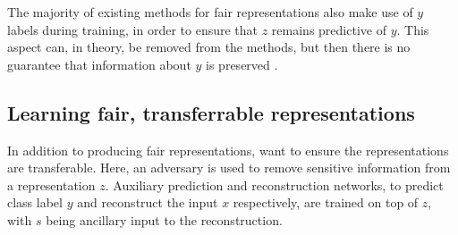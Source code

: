 The majority of existing methods for fair representations also make use of $y$ labels during
training, in order to ensure that $z$ remains predictive of $y$. This aspect can, in theory,
be removed from the methods, but then there is no guarantee that information about $y$ is preserved
\citep{louizos2016variational}. 

\subsection{Learning fair, transferrable representations}
In addition to producing fair representations, \citet{madras2018learning} want to ensure the
representations are transferable. Here, an adversary is used to remove sensitive information from
a representation $z$. Auxiliary prediction and reconstruction networks, to predict class label $y$
and reconstruct the input $x$ respectively, are trained on top of $z$, with $s$ being ancillary
input to the reconstruction.

